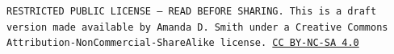 \documentclass[10pt]{article}
\begin{document}

\bigskip

\noindent
\texttt{\footnotesize RESTRICTED PUBLIC LICENSE --- READ BEFORE SHARING. This is a draft version made available by Amanda D. Smith under a Creative Commons Attribution-NonCommercial-ShareAlike license. 
\href{https://creativecommons.org/licenses/by-nc-sa/4.0/}{CC BY-NC-SA 4.0}}

\newpage
\printbibliography
\end{document}
